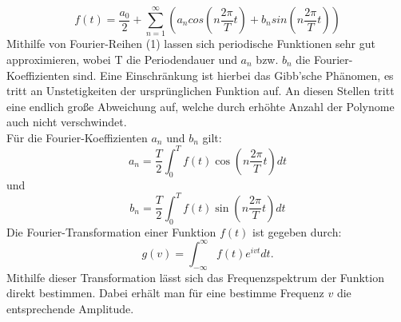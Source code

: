 \begin{equation} 
f(t) = \frac{a_0}{2} + \sum_{n=1}^\infty (a_n cos(n\frac{2\pi}{T}t) + b_n sin(n\frac{2\pi}{T}t)) 
\end{equation}
Mithilfe von Fourier-Reihen (1) lassen sich periodische Funktionen sehr gut approximieren, wobei T die Periodendauer und $a_n$ bzw. $b_n$ die Fourier-Koeffizienten sind. Eine Einschränkung ist hierbei das Gibb'sche Phänomen, es tritt an Unstetigkeiten der ursprünglichen Funktion auf. An diesen Stellen tritt eine endlich große Abweichung auf, welche durch erhöhte Anzahl der Polynome auch nicht verschwindet. \\
Für die Fourier-Koeffizienten $a_n$ und $b_n$ gilt:
\begin{equation}
a_n = \frac{T}{2}\int_{0}^{T} f(t) \cos(n\frac{2\pi}{T}t) dt
\end{equation}
und
\begin{equation}
b_n = \frac{T}{2}\int_{0}^{T} f(t) \sin(n\frac{2\pi}{T}t) dt
\end{equation}
Die Fourier-Transformation einer Funktion $f(t)$ ist gegeben durch:
\begin{equation}
g(v) = \int_{-\infty}^{\infty} f(t) e^{ivt} dt.
\end{equation}
Mithilfe dieser Transformation lässt sich das Frequenzspektrum der Funktion direkt bestimmen. Dabei erhält man für eine bestimme Frequenz $v$ die entsprechende Amplitude.
